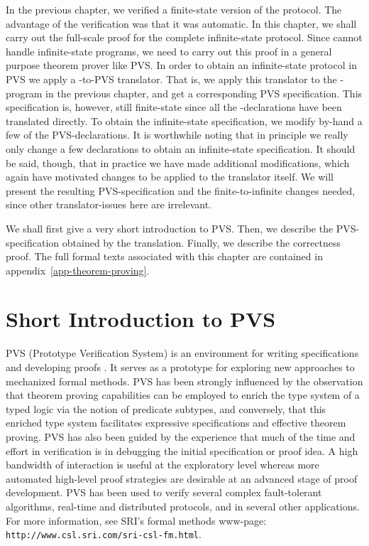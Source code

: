 

In the   previous chapter, we  verified a  finite-state version of the
protocol.  The  advantage of     the  verification was that     it was
automatic.  In  this chapter, we shall  carry out the full-scale proof
for  the   complete infinite-state protocol.   Since  \Murphi{} cannot
handle infinite-state programs,  we need to  carry out this proof in a
general   purpose  theorem prover like PVS.     In order to  obtain an
infinite-state  protocol   in  PVS     we  apply a      \Murphi-to-PVS
translator. That  is, we apply  this translator to the \Murphi-program
in  the previous chapter,  and get  a corresponding PVS specification.
This specification is, however, still finite-state since all the
\Murphi{}-declarations have been  translated  directly.  To obtain the
infinite-state   specification, we   modify  by-hand  a   few  of  the
PVS-declarations.  It is worthwhile noting that in principle we really
only    change a  few    declarations   to obtain  an   infinite-state
specification.   It should be said, though,  that  in practice we have
made additional modifications,  which again have motivated changes  to
be  applied to the translator itself.   We will  present the resulting
PVS-specification  and the  finite-to-infinite  changes needed,  since
other translator-issues here are irrelevant.

We  shall  first give  a  very short   introduction to  PVS.  Then, we
describe the PVS-specification obtained  by the translation.  Finally,
we  describe the correctness proof.    The full formal texts associated
with this chapter are contained in appendix~\ref{app-theorem-proving}.


\section{Short Introduction to PVS}

PVS  (Prototype  Verification System) is   an  environment for writing
specifications  and developing proofs \cite{ORS:PVS}.   It serves as a
prototype  for exploring new  approaches to mechanized formal methods.
PVS has  been strongly   influenced by  the observation  that  theorem
proving  capabilities can be employed to  enrich the type  system of a
typed logic via the notion of predicate subtypes, and conversely, that
this  enriched type  system  facilitates expressive specifications and
effective theorem proving.  PVS has also been guided by the experience
that much of the  time and effort  in verification is in debugging the
initial specification or proof idea.   A high bandwidth of interaction
is useful at the exploratory  level whereas more automated  high-level
proof   strategies  are desirable  at   an   advanced  stage of  proof
development.    PVS   has   been  used   to    verify several  complex
fault-tolerant algorithms, real-time and distributed protocols, and in
several other  applications.   For more information,  see SRI's formal
methods www-page: {\tt http://www.csl.sri.com/sri-csl-fm.html}.


